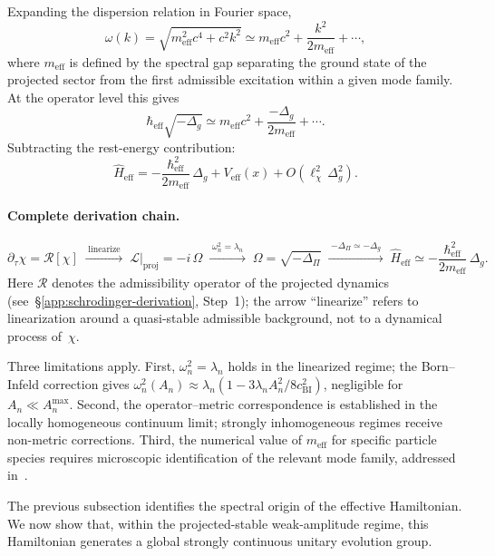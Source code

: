     Expanding the dispersion relation in Fourier space,
    \[
      \omega(k) = \sqrt{m_{\mathrm{eff}}^2 c^4 + c^2 k^2}
      \simeq m_{\mathrm{eff}} c^2 + \frac{k^2}{2m_{\mathrm{eff}}} + \cdots,
    \]
    where $m_{\mathrm{eff}}$ is defined by the spectral gap separating the ground state of
    the projected sector from the first admissible excitation within a given mode family.
    At the operator level this gives
    \[
      \hbar_{\mathrm{eff}}\sqrt{-\Delta_g}
      \simeq m_{\mathrm{eff}} c^2 + \frac{-\Delta_g}{2m_{\mathrm{eff}}} + \cdots.
    \]
    Subtracting the rest-energy contribution:
    \[
      \hat{H}_{\mathrm{eff}}
      = -\frac{\hbar_{\mathrm{eff}}^2}{2m_{\mathrm{eff}}}\,\Delta_g + V_{\mathrm{eff}}(x)
      + O\!\left(\ell_{\chi}^2\,\Delta_g^2\right).
    \]

  \paragraph{Complete derivation chain.}

    \[
      \partial_\tau \chi = \mathcal{R}[\chi]
      \;\xrightarrow{\;\text{linearize}\;}\;
      \mathcal{L}|_{\mathrm{proj}} = -i\,\Omega
      \;\xrightarrow{\;\omega_n^2 = \lambda_n\;}\;
      \Omega = \sqrt{-\Delta_\Pi}
      \;\xrightarrow{\;{-\Delta_\Pi \simeq -\Delta_g}\;}\;
      \hat{H}_{\mathrm{eff}} \simeq -\frac{\hbar_{\mathrm{eff}}^2}{2m_{\mathrm{eff}}}\,\Delta_g.
    \]
    Here $\mathcal{R}$ denotes the admissibility operator of the projected dynamics
    (see~§\ref{app:schrodinger-derivation}, Step~1); the arrow ``linearize'' refers to linearization around a
    quasi-stable admissible background, not to a dynamical process of~$\chi$.

    Three limitations apply.
    First, $\omega_n^2 = \lambda_n$ holds in the linearized regime; the Born--Infeld
    correction gives $\omega_n^2(A_n) \approx \lambda_n(1 - 3\lambda_n A_n^2/8c_{\mathrm{BI}}^2)$,
    negligible for $A_n \ll A_n^{\max}$.
    Second, the operator--metric correspondence is established in the locally homogeneous
    continuum limit; strongly inhomogeneous regimes receive non-metric corrections.
    Third, the numerical value of $m_{\mathrm{eff}}$ for specific particle species requires
    microscopic identification of the relevant mode family, addressed in~\cite{Beau2026e}.

    The previous subsection identifies the spectral origin of the effective Hamiltonian.
    We now show that, within the projected-stable weak-amplitude regime, this Hamiltonian
    generates a global strongly continuous unitary evolution group.
